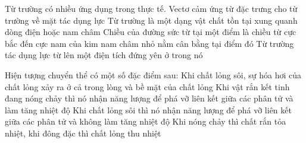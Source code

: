 	\begin{ex}%
		Từ trường có nhiều ứng dụng trong thực tế.
		\choiceTFt
		{\True Vectơ cảm ứng từ đặc trưng cho từ trường về mặt tác dụng lực}
		{\True Từ trường là một dạng vật chất tồn tại xung quanh dòng điện hoặc nam châm}
		{Chiều của đường sức từ tại một điểm là chiều từ cực bắc đến cực nam của kim nam châm nhỏ nằm cân bằng tại điểm đó}
		{Từ trường tác dụng lực từ lên một điện tích đứng yên ở trong nó}
	\end{ex}

	\begin{ex}%
		Hiện tượng chuyển thể có một số đặc điểm sau:
		\choiceTFt
		{\True Khi chất lỏng sôi, sự hóa hơi của chất lỏng xảy ra ở cả trong lòng và bề mặt của chất lỏng}
		{Khi vật rắn kết tinh đang nóng chảy thì nó nhận năng lượng để phá vỡ liên kết giữa các phân tử và làm tăng nhiệt độ}
		{\True Khi chất lỏng sôi thì nó nhận năng lượng để phá vỡ liên kết giữa các phân tử và không làm tăng nhiệt độ}
		{Khi nóng chảy thì chất rắn tỏa nhiệt, khi đông đặc thì chất lỏng thu nhiệt}
	\end{ex}

